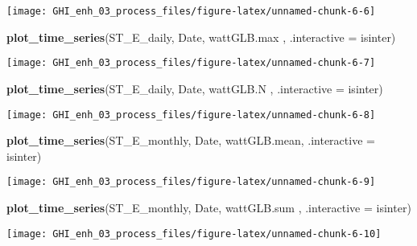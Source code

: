\documentclass[
  10pt,
  a4paper,oneside]{article}
\newenvironment{Shaded}{\begin{snugshade}}{\end{snugshade}}
\newcommand{\AttributeTok}[1]{\textcolor[rgb]{0.13,0.29,0.53}{#1}}
\newcommand{\FunctionTok}[1]{\textcolor[rgb]{0.13,0.29,0.53}{\textbf{#1}}}
\newcommand{\NormalTok}[1]{#1}
\begin{document}
\begin{center}\texttt{[image: GHI\_enh\_03\_process\_files/figure-latex/unnamed-chunk-6-6]} \end{center}

\begin{Shaded}
\begin{Highlighting}[]
\FunctionTok{plot\_time\_series}\NormalTok{(ST\_E\_daily, Date, wattGLB.max , }\AttributeTok{.interactive =}\NormalTok{ isinter)}
\end{Highlighting}
\end{Shaded}

\begin{center}\texttt{[image: GHI\_enh\_03\_process\_files/figure-latex/unnamed-chunk-6-7]} \end{center}

\begin{Shaded}
\begin{Highlighting}[]
\FunctionTok{plot\_time\_series}\NormalTok{(ST\_E\_daily, Date, wattGLB.N   , }\AttributeTok{.interactive =}\NormalTok{ isinter)}
\end{Highlighting}
\end{Shaded}

\begin{center}\texttt{[image: GHI\_enh\_03\_process\_files/figure-latex/unnamed-chunk-6-8]} \end{center}

\begin{Shaded}
\begin{Highlighting}[]
\FunctionTok{plot\_time\_series}\NormalTok{(ST\_E\_monthly, Date, wattGLB.mean, }\AttributeTok{.interactive =}\NormalTok{ isinter)}
\end{Highlighting}
\end{Shaded}

\begin{center}\texttt{[image: GHI\_enh\_03\_process\_files/figure-latex/unnamed-chunk-6-9]} \end{center}

\begin{Shaded}
\begin{Highlighting}[]
\FunctionTok{plot\_time\_series}\NormalTok{(ST\_E\_monthly, Date, wattGLB.sum , }\AttributeTok{.interactive =}\NormalTok{ isinter)}
\end{Highlighting}
\end{Shaded}

\begin{center}\texttt{[image: GHI\_enh\_03\_process\_files/figure-latex/unnamed-chunk-6-10]} \end{center}
\end{document}
